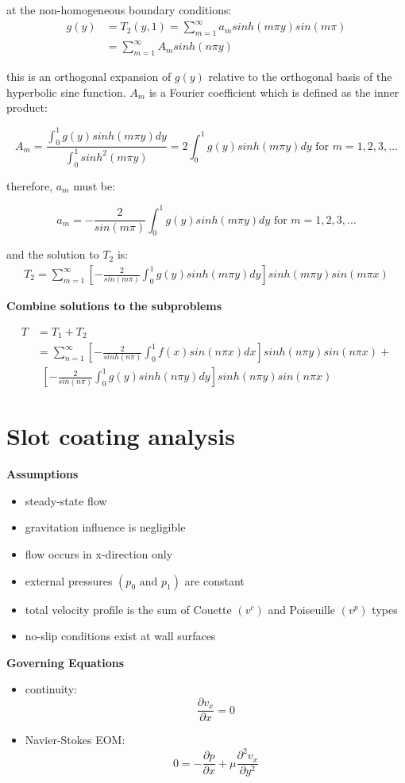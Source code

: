 \documentclass[letterpaper, 10pt, oneside]{article}
\newenvironment{dd}[1]{
	\noindent
	\textbf{\normalsize{#1}}
	\hspace{0.1in}
	\small
	\rmfamily
	}
	{\medskip}
\newcommand{\as}[1]{\begin{align*}#1\end{align*}}
\newcommand{\an}[1]{\begin{align}#1\end{align}}
\newcommand{\bdd}{\begin{dd}}
\newcommand{\edd}{\end{dd}}
\newcommand{\bi}{\begin{itemize}}
\newcommand{\ei}{\end{itemize}}
\begin{document}
	 at the non-homogeneous boundary conditions:
	 \as{g(y) &= T_2(y,1) = \sum_{m=1}^\infty a_m sinh\left( m\pi y \right) sin\left( m\pi  \right)\\
	 &=\sum_{m=1}^\infty A_m sinh\left( n\pi y \right)}

	 this is an orthogonal expansion of $g(y)$ relative to the orthogonal basis of the hyperbolic sine function. $A_m$ is a Fourier coefficient which is defined as the inner product:

	 $$A_m = \frac{\int_0^1 g(y) sinh
	 (m \pi y) dy }{\int_0^1 sinh^2(m\pi y)} = 2 \int_0^1 g(y)sinh(m\pi y) dy \text{ for } m = 1,2,3, \ldots$$

	 therefore, $a_m$ must be:

	 $$a_m = -\frac{2}{sin(m\pi)}\int_0^1 g(y)sinh(m \pi y) dy \text{ for } m = 1,2,3, \ldots$$

	 and the solution to $T_2$ is:
	 \an{T_2 = \sum_{m=1}^\infty \left[-\frac{2}{sin(m\pi)}\int_0^1 g(y)sinh(m \pi y) dy \right]sinh\left( m\pi y \right) sin\left( m\pi x \right)}
\edd

\bdd {Combine solutions to the subproblems}
	\an{T &= T_1 + T_2 \\
	&= \sum_{n=1}^\infty \left[-\frac{2}{sinh(n\pi)}\int_0^1 f(x)sin(n \pi x) dx \right]sinh\left( n\pi y \right) sin\left( n\pi x \right) + \\ \ & \ \ 
	 \left[-\frac{2}{sin(n\pi)}\int_0^1 g(y)sinh(n \pi y) dy \right]sinh\left( n\pi y \right) sin\left( n\pi x \right)}
\edd

\section{Slot coating analysis}

\bdd{Assumptions}
	\bi
		\item steady-state flow
		\item gravitation influence is negligible
		\item flow occurs in x-direction only
		\item external pressures $(p_0 \text{ and } p_1)$ are constant
		\item total velocity profile is the sum of Couette $(v^c)$ and Poiseuille $(v^p)$ types
		\item no-slip conditions exist at wall surfaces
	\ei
\edd

\bdd{Governing Equations}
	\bi
		\item continuity: $$\frac{\partial v_x}{\partial x}= 0$$
		\item Navier-Stokes EOM: $$ 0= -\frac{\partial p}{\partial x} + \mu  \frac{\partial^2 v_x}{\partial y^2}$$
	\ei
\edd
\end{document}
